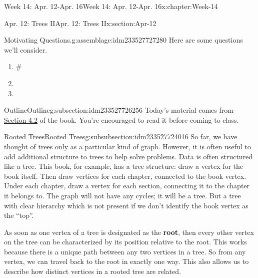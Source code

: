\documentclass[oneside,10pt,]{book}
\newcommand{\terminology}[1]{\textbf{#1}}
\numberwithin{equation}{section}
\begin{document}
\begin{chapterptx}{Week 14: Apr. 12-Apr. 16}{}{Week 14: Apr. 12-Apr. 16}{}{}{x:chapter:Week-14}
%
%
\typeout{************************************************}
\typeout{************************************************}
%
\begin{sectionptx}{Apr. 12: Trees II}{}{Apr. 12: Trees II}{}{}{x:section:Apr-12}
\begin{introduction}{}%
\begin{assemblage}{Motivating Questions.}{g:assemblage:idm233527727280}%
Here are some questions we'll consider. %
\begin{enumerate}
\item{}\#%
\item{}%
\item{}%
\end{enumerate}
%
\end{assemblage}
\end{introduction}%
%
%
\typeout{************************************************}
\typeout{************************************************}
%
\begin{subsectionptx}{Outline}{}{Outline}{}{}{g:subsection:idm233527726256}
Today's material comes from \href{http://discrete.openmathbooks.org/dmoi3/sec_trees.html}{Section 4.2} of the book. You're encouraged to read it before coming to class.%
%
%
\typeout{************************************************}
\typeout{************************************************}
%
\begin{subsubsectionptx}{Rooted Trees}{}{Rooted Trees}{}{}{g:subsubsection:idm233527724016}
%
%
So far, we have thought of trees only as a particular kind of graph. However, it is often useful to add additional structure to trees to help solve problems. Data is often structured like a tree. This book, for example, has a tree structure: draw a vertex for the book itself. Then draw vertices for each chapter, connected to the book vertex. Under each chapter, draw a vertex for each section, connecting it to the chapter it belongs to. The graph will not have any cycles; it will be a tree. But a tree with clear hierarchy which is not present if we don't identify the book vertex as the ``top''.%
\par
{} As soon as one vertex of a tree is designated as the \terminology{root}, then every other vertex on the tree can be characterized by its position relative to the root.  This works because there is a unique path between any two vertices in a tree.  So from any vertex, we can travel back to the root in exactly one way.  This also allows us to describe how distinct vertices in a rooted tree are related.%

\end{subsubsectionptx}
\end{subsectionptx}
\end{sectionptx}
\end{chapterptx}
\end{document}
